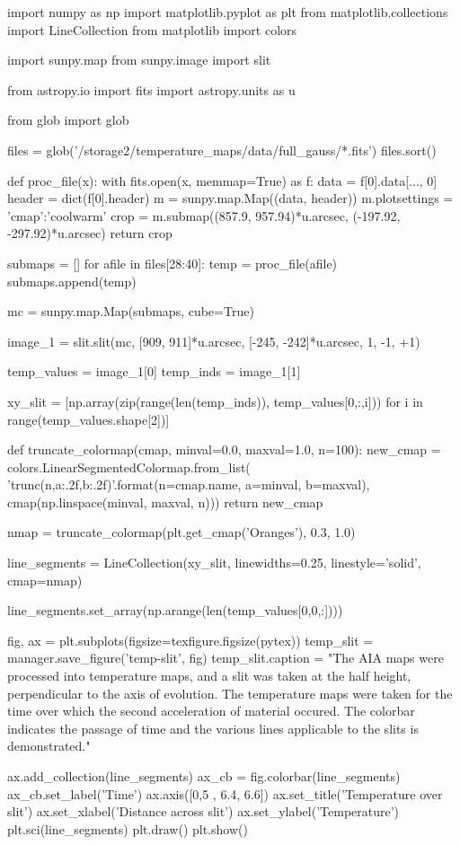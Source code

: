 \documentclass{emulateapj}
\begin{document}
\begin{pycode}
import numpy as np
import matplotlib.pyplot as plt
from matplotlib.collections import LineCollection
from matplotlib import colors

import sunpy.map
from sunpy.image import slit

from astropy.io import fits
import astropy.units as u

from glob import glob

files = glob('/storage2/temperature_maps/data/full_gauss/*.fits')
files.sort()

def proc_file(x):
    with fits.open(x, memmap=True) as f:
        data = f[0].data[..., 0]
        header = dict(f[0].header)
        m = sunpy.map.Map((data, header))
        m.plotsettings = {'cmap':'coolwarm'}
        crop = m.submap((857.9, 957.94)*u.arcsec,
                 (-197.92, -297.92)*u.arcsec)
    return crop 


submaps = []
for afile in files[28:40]:
    temp = proc_file(afile)
    submaps.append(temp)

mc = sunpy.map.Map(submaps, cube=True)


image_1 = slit.slit(mc, [909, 911]*u.arcsec, [-245, -242]*u.arcsec, 1, -1, +1)

temp_values = image_1[0]
temp_inds = image_1[1]


xy_slit = [np.array(zip(range(len(temp_inds)), temp_values[0,:,i])) for i in range(temp_values.shape[2])]

def truncate_colormap(cmap, minval=0.0, maxval=1.0, n=100):
    new_cmap = colors.LinearSegmentedColormap.from_list(
        'trunc({n},{a:.2f},{b:.2f})'.format(n=cmap.name, a=minval, b=maxval),
        cmap(np.linspace(minval, maxval, n)))
    return new_cmap

nmap = truncate_colormap(plt.get_cmap('Oranges'), 0.3, 1.0)

line_segments = LineCollection(xy_slit,
                               linewidths=0.25,
                               linestyle='solid',
                               cmap=nmap)

line_segments.set_array(np.arange(len(temp_values[0,0,:])))

fig, ax = plt.subplots(figsize=texfigure.figsize(pytex))
temp_slit = manager.save_figure('temp-slit', fig)
temp_slit.caption = "The AIA maps were processed into temperature maps, and a slit was taken at the half height, perpendicular to the axis of evolution. The temperature maps were taken for the time over which the second acceleration of material occured. The colorbar indicates the passage of time and the various lines applicable to the slits is demonstrated."


ax.add_collection(line_segments)
ax_cb = fig.colorbar(line_segments)
ax_cb.set_label('Time')
ax.axis([0,5 , 6.4, 6.6])
ax.set_title('Temperature over slit')
ax.set_xlabel('Distance across slit')
ax.set_ylabel('Temperature')
plt.sci(line_segments)
plt.draw()
plt.show()

\end{pycode}
\end{document}
